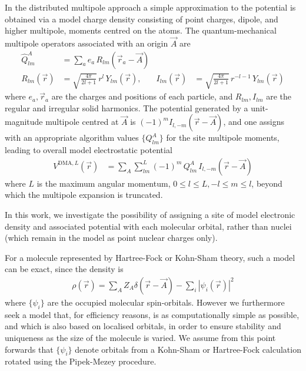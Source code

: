 \documentclass[journal=jacsat,manuscript=article]{achemso}
\begin{document}
In the distributed multipole approach\cite{Stone1981,Stone1985,Stone2005} a simple approximation to the potential is
obtained via  a model charge density consisting of point charges, dipole, and higher multipole, moments centred on the atoms.
The quantum-mechanical multipole operators associated with an origin $\vec A$ are\cite{Stone2013}
\begin{align}
    \hat Q_{lm}^A &= \sum_a e_a\, R_{lm}(\vec r_a-\vec A)
    \\
R_{lm}(\vec r)&=\sqrt{\frac{4\pi}{2l+1}}\,r^l \, Y_{lm}(\vec r)
,&
I_{lm}(\vec r)&=\sqrt{\frac{4\pi}{2l+1}}\,r^{-l-1} \, Y_{lm}(\vec r)
\end{align}
where
$e_a, \vec r_a$ are the charges and positions of each particle, and 
$R_{lm}, I_{lm}$ are the regular and irregular solid harmonics\cite{Whittaker1927, Stone2013}.
The potential generated by a unit-magnitude multipole  centred at $\vec A$ is
    $ (-1)^m I_{l,-m}(\vec r-\vec A)$,
and one assigns
with an appropriate algorithm\cite{Stone1981,Stone1985,Stone2005}
values $\{Q^A_{lm}\}$ for the site multipole moments, leading to overall model electrostatic potential
\begin{align}
    V^{\text{DMA},L}(\vec r) &= \sum_A \sum_{lm}^L(-1)^m\, Q^A_{lm}\, I_{l,-m}(\vec r-\vec A)
\end{align}
where $L$ is the
maximum angular momentum, $0\le l\le L, -l\le m\le l$, beyond which the multipole expansion is truncated.

In this work, we investigate the possibility of assigning a site of model electronic density and associated potential with each molecular orbital, rather than nuclei (which remain in the model as point nuclear charges only).

For a molecule represented by Hartree-Fock or Kohn-Sham theory, such a model can be exact, since the density is
\begin{align}
    \rho(\vec r) = \sum_A Z_A \delta(\vec r - \vec A)
    -\sum_i |\psi_i(\vec r)|^2
\end{align}
where $\{\psi_i\}$ are the occupied molecular spin-orbitals.
However we furthermore seek a model that, for efficiency reasons, is as computationally
simple as possible, and which is also based on localised orbitals, in order
to ensure stability and uniqueness as the size of the molecule is varied. We assume
from this point forwards that $\{\psi_i\}$ denote orbitals from a Kohn-Sham
or Hartree-Fock calculation rotated using the Pipek-Mezey procedure\cite{Pipek1989a}.
\end{document}
